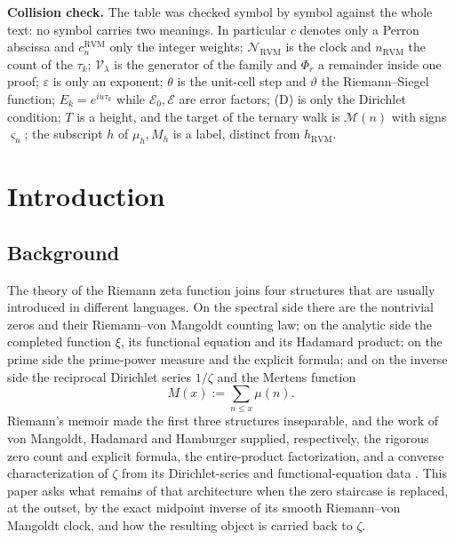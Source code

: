 \documentclass[11pt,reqno]{amsart}
\makeatletter
\let\CG@origcite\cite
\renewcommand*{\cite}[2][]{\def\CG@citekey{#2}%
  \ifx\relax#1\relax\CG@origcite{#2}\else\CG@origcite[#1]{#2}\fi}
\numberwithin{equation}{section}
\theoremstyle{plain}
\theoremstyle{definition}
\theoremstyle{remark}
\newcommand{\eps}{\varepsilon}
\newcommand{\RVM}{\mathrm{RVM}}
\newcommand{\NR}{\mathcal N_{\RVM}}
\makeatother
\begin{document}
\medskip\noindent\textbf{Collision check.}
The table was checked symbol by symbol against the whole text: no symbol carries two meanings.  In particular $c$ denotes only a Perron abscissa and $c_n^{\RVM}$ only the integer weights; $\NR$ is the clock and $n_{\RVM}$ the count of the $\tau_k$; $\mathcal V_\lambda$ is the generator of the family and $\Phi_r$ a remainder inside one proof; $\eps$ is only an exponent; $\theta$ is the unit-cell step and $\vartheta$ the Riemann--Siegel function; $E_k=e^{iu\tau_k}$ while $\mathcal E_0,\mathcal E$ are error factors; (D) is only the Dirichlet condition; $T$ is a height, and the target of the ternary walk is $\mathcal M(n)$ with signs $\varsigma_n$; the subscript $h$ of $\mu_h,M_h$ is a label, distinct from $h_{\RVM}$.


\section{Introduction}
\label{sec:introduction}

\subsection{Background}
\label{subsec:background}

The theory of the Riemann zeta function joins four structures that are usually introduced in different languages.  On the spectral side there are the nontrivial zeros and their Riemann--von Mangoldt counting law; on the analytic side the completed function $\xi$, its functional equation and its Hadamard product; on the prime side the prime-power measure and the explicit formula; and on the inverse side the reciprocal Dirichlet series $1/\zeta$ and the Mertens function
\begin{equation}\label{eq:mertens-def}
 M(x):=\sum_{n\le x}\mu(n).
\end{equation}
Riemann's memoir made the first three structures inseparable, and the work of von Mangoldt, Hadamard and Hamburger supplied, respectively, the rigorous zero count and explicit formula, the entire-product factorization, and a converse characterization of $\zeta$ from its Dirichlet-series and functional-equation data \cite{Riemann1859,vonMangoldt1895,Hadamard1896,Hamburger1921,Titchmarsh1986,Edwards1974}.  This paper asks what remains of that architecture when the zero staircase is replaced, at the outset, by the exact midpoint inverse of its smooth Riemann--von Mangoldt clock, and how the resulting object is carried back to $\zeta$.
\end{document}
